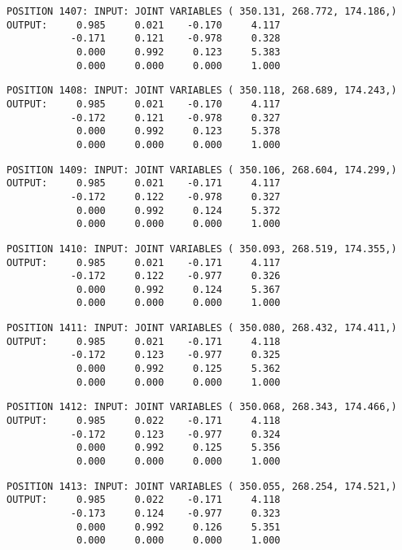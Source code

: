 \begin{verbatim}
POSITION 1407: INPUT: JOINT VARIABLES ( 350.131, 268.772, 174.186,)
OUTPUT:     0.985     0.021    -0.170     4.117
           -0.171     0.121    -0.978     0.328
            0.000     0.992     0.123     5.383
            0.000     0.000     0.000     1.000
\end{verbatim} \pagebreak[1]\begin{verbatim}
POSITION 1408: INPUT: JOINT VARIABLES ( 350.118, 268.689, 174.243,)
OUTPUT:     0.985     0.021    -0.170     4.117
           -0.172     0.121    -0.978     0.327
            0.000     0.992     0.123     5.378
            0.000     0.000     0.000     1.000
\end{verbatim} \pagebreak[1]\begin{verbatim}
POSITION 1409: INPUT: JOINT VARIABLES ( 350.106, 268.604, 174.299,)
OUTPUT:     0.985     0.021    -0.171     4.117
           -0.172     0.122    -0.978     0.327
            0.000     0.992     0.124     5.372
            0.000     0.000     0.000     1.000
\end{verbatim} \pagebreak[1]\begin{verbatim}
POSITION 1410: INPUT: JOINT VARIABLES ( 350.093, 268.519, 174.355,)
OUTPUT:     0.985     0.021    -0.171     4.117
           -0.172     0.122    -0.977     0.326
            0.000     0.992     0.124     5.367
            0.000     0.000     0.000     1.000
\end{verbatim} \pagebreak[1]\begin{verbatim}
POSITION 1411: INPUT: JOINT VARIABLES ( 350.080, 268.432, 174.411,)
OUTPUT:     0.985     0.021    -0.171     4.118
           -0.172     0.123    -0.977     0.325
            0.000     0.992     0.125     5.362
            0.000     0.000     0.000     1.000
\end{verbatim} \pagebreak[1]\begin{verbatim}
POSITION 1412: INPUT: JOINT VARIABLES ( 350.068, 268.343, 174.466,)
OUTPUT:     0.985     0.022    -0.171     4.118
           -0.172     0.123    -0.977     0.324
            0.000     0.992     0.125     5.356
            0.000     0.000     0.000     1.000
\end{verbatim} \pagebreak[1]\begin{verbatim}
POSITION 1413: INPUT: JOINT VARIABLES ( 350.055, 268.254, 174.521,)
OUTPUT:     0.985     0.022    -0.171     4.118
           -0.173     0.124    -0.977     0.323
            0.000     0.992     0.126     5.351
            0.000     0.000     0.000     1.000
\end{verbatim} \pagebreak[1]\begin{verbatim}

\end{verbatim}
